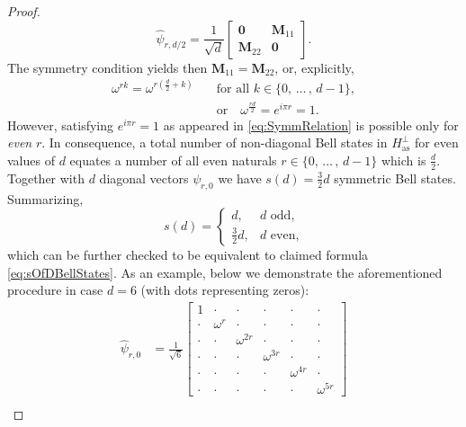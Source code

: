 \documentclass[reqno]{amsart}
\theoremstyle{plain}
\theoremstyle{note}
\newcommand{\aspace}{H_{\mathrm{as}}}
\begin{document}
\begin{proof}
\begin{equation}
    \hat{\psi}_{r,d/2} = \frac{1}{\sqrt{d}} \left[ \begin{array}{c|c} \mathbf{0} & \mathbf{M}_{11} \\ \hline \mathbf{M}_{22} & \mathbf{0} \end{array} \right].
\end{equation}
The symmetry condition yields then $\mathbf{M}_{11} = \mathbf{M}_{22}$, or, explicitly,
\begin{align}\label{eq:SymmRelation}
    \omega^{rk} = \omega^{r\left(\frac{d}{2} + k\right)} \quad &\text{for all } k \in \{0,\, \ldots \, , \, d-1\},\\
    &\text{or} \quad \omega^{\frac{rd}{2}} = e^{i\pi r} = 1.\nonumber
\end{align}
However, satisfying $e^{i\pi r} = 1$ as appeared in \eqref{eq:SymmRelation} is possible only for \emph{even} $r$. In consequence, a total number of non-diagonal Bell states in $\aspace^{\perp}$ for even values of $d$ equates a number of all even naturals $r \in \{0, \, \ldots \, , \, d-1\}$ which is $\frac{d}{2}$. Together with $d$ diagonal vectors $\psi_{r,0}$ we have $s(d) = \frac{3}{2}d$ symmetric Bell states. Summarizing,
\begin{equation}
    s(d) = \begin{cases}
        d, & d \text{ odd,} \\
        \frac{3}{2}d, & d \text{ even,}
        \end{cases}
\end{equation}
which can be further checked to be equivalent to claimed formula \eqref{eq:sOfDBellStates}. As an example, below we demonstrate the aforementioned procedure in case $d=6$ (with dots representing zeros):
\small
\begin{align}
\hat{\psi}_{r,0} &= \frac{1}{\sqrt{6}}
    \left[
    \begin{array}{ccc|ccc}
        1 & \cdot    & \cdot & \cdot & \cdot & \cdot \\
        \cdot   & \omega^r & \cdot & \cdot & \cdot & \cdot \\
        \cdot   & \cdot    & \omega^{2r} & \cdot & \cdot & \cdot \\
        \hline
        \cdot   & \cdot    & \cdot & \omega^{3r} & \cdot & \cdot \\
        \cdot   & \cdot    & \cdot & \cdot & \omega^{4r} & \cdot \\
        \cdot   & \cdot    & \cdot & \cdot & \cdot & \omega^{5r}
    \end{array} \right] \\

\end{align}
\end{proof}
\end{document}
